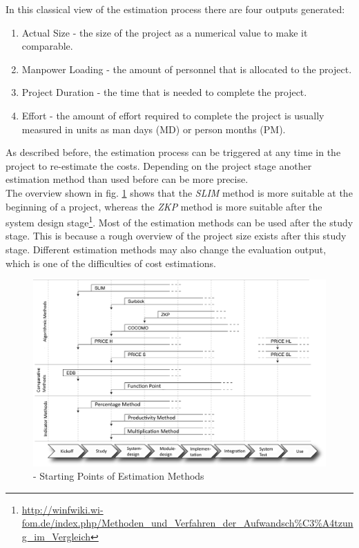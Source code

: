 In this classical view of the estimation process there are four outputs generated:
\begin{enumerate}
	\item Actual Size - the size of the project as a numerical value to make it comparable.
	\item Manpower Loading - the amount of personnel that is allocated to the project.
	\item Project Duration - the time that is needed to complete the project.
	\item Effort - the amount of effort required to complete the project is usually measured in units as man days (MD) or person months (PM).
\end{enumerate}
As described before, the estimation process can be triggered at any time in the project to re-estimate the costs. Depending on the project stage another estimation method than used before can be more precise.\\
The overview shown in fig. \ref{fig:estimationMethodInStage} shows that the \textit{SLIM} method is more suitable at the beginning of a project, whereas the \textit{ZKP} method is more suitable after the system design stage\footnote{\url{http://winfwiki.wi-fom.de/index.php/Methoden_und_Verfahren_der_Aufwandsch\%C3\%A4tzung_im_Vergleich}}. Most of the estimation methods can be used after the study stage. This is because a rough overview of the project size exists after this study stage. Different estimation methods may also change the evaluation output, which is one of the difficulties of cost estimations.\\
\begin{figure}[h] 
	\centering 
	\includegraphics[width=13cm]{images/Einsatzzeitpunkte2.PNG} 
	\caption{- Starting Points of Estimation Methods} 
	\label{fig:estimationMethodInStage}
\end{figure}

